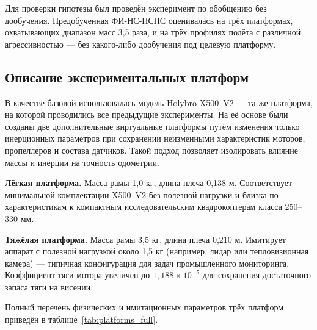 Для проверки гипотезы был проведён эксперимент по обобщению без дообучения. Предобученная ФИ-НС-ПСПС оценивалась на трёх платформах, охватывающих диапазон масс 3,5 раза, и на трёх профилях полёта с различной агрессивностью — без какого-либо дообучения под целевую платформу. 

\subsection{Описание экспериментальных платформ}

В качестве базовой использовалась модель Holybro X500~V2 — та же платформа, на которой проводились все предыдущие эксперименты. На её основе были созданы две дополнительные виртуальные платформы путём изменения только инерционных параметров при сохранении неизменными характеристик моторов, пропеллеров и состава датчиков. Такой подход позволяет изолировать влияние массы и инерции на точность одометрии.

\textbf{Лёгкая платформа.} Масса рамы 1,0 кг, длина плеча 0,138 м. Соответствует минимальной комплектации X500~V2 без полезной нагрузки и близка по характеристикам к компактным исследовательским квадрокоптерам класса 250--330 мм.

\textbf{Тяжёлая платформа.} Масса рамы 3,5 кг, длина плеча 0,210 м. Имитирует аппарат с полезной нагрузкой около 1,5 кг (например, лидар или тепловизионная камера) — типичная конфигурация для задач промышленного мониторинга. Коэффициент тяги мотора увеличен до $1{,}188 \times 10^{-5}$ для сохранения достаточного запаса тяги на висении.

Полный перечень физических и имитационных параметров трёх платформ приведён в таблице~\ref{tab:platforms_full}.

